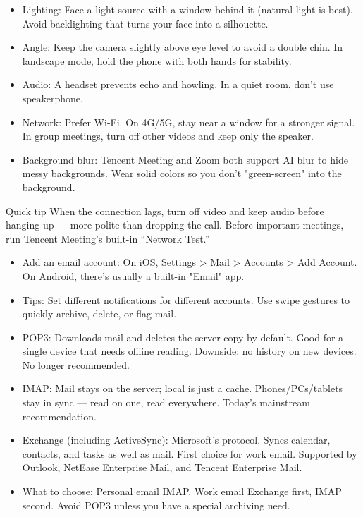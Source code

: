 \begin{itemize}
  \item Lighting: Face a light source with a window behind it (natural light is best). Avoid backlighting that turns your face into a silhouette.
  \item Angle: Keep the camera slightly above eye level to avoid a double chin. In landscape mode, hold the phone with both hands for stability.
  \item Audio: A headset prevents echo and howling. In a quiet room, don't use speakerphone.
  \item Network: Prefer Wi-Fi. On 4G/5G, stay near a window for a stronger signal. In group meetings, turn off other videos and keep only the speaker.
  \item Background blur: Tencent Meeting and Zoom both support AI blur to hide messy backgrounds. Wear solid colors so you don't "green-screen" into the background.
\end{itemize}

\begin{tcbinfo}{Quick tip}
When the connection lags, turn off video and keep audio before hanging up — more polite than dropping the call. Before important meetings, run Tencent Meeting's built-in “Network Test.”

\end{tcbinfo}


\begin{itemize}
  \item Add an email account: On iOS, Settings > Mail > Accounts > Add Account. On Android, there's usually a built-in "Email" app.
  \item Tips: Set different notifications for different accounts. Use swipe gestures to quickly archive, delete, or flag mail.
\end{itemize}


\begin{itemize}
  \item POP3: Downloads mail and deletes the server copy by default. Good for a single device that needs offline reading. Downside: no history on new devices. No longer recommended.
  \item IMAP: Mail stays on the server; local is just a cache. Phones/PCs/tablets stay in sync — read on one, read everywhere. Today's mainstream recommendation.
  \item Exchange (including ActiveSync): Microsoft's protocol. Syncs calendar, contacts, and tasks as well as mail. First choice for work email. Supported by Outlook, NetEase Enterprise Mail, and Tencent Enterprise Mail.
  \item What to choose: Personal email IMAP. Work email Exchange first, IMAP second. Avoid POP3 unless you have a special archiving need.
\end{itemize}

